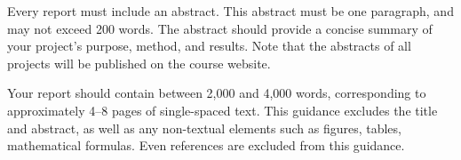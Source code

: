 Every report must include an abstract. This abstract must be one paragraph,
and may not exceed 200 words. The abstract should provide a concise summary of
your project’s purpose, method, and results. Note that the abstracts of all projects will
be published on the course website.

Your report should contain between 2,000 and 4,000 words, corresponding
to approximately 4–8 pages of single-spaced text. This guidance excludes the title
and abstract, as well as any non-textual elements such as figures, tables, mathematical
formulas. Even references are excluded from this guidance.
